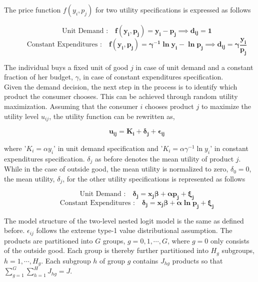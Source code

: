 \documentclass[a4paper,11pt]{article}
\begin{document}
    \newpage
    The price function $f(y_{i},p_{j})$ for two utility specifications is expressed as follows 

    \begin{equation*}
        \qquad \text{Unit Demand :} \quad \mathbf{f(y_{i},p_{j}) = y_{i} - p_{j} \implies d_{ij} = 1}
    \end{equation*}
    \begin{equation*}
        \qquad \text{Constant Expenditures :} \quad \mathbf{f(y_{i},p_{j}) = \gamma^{-1}\ln y_{i} - \ln p_{j} \implies d_{ij} = \gamma\dfrac{y_{i}}{p_{j}}}
    \end{equation*}

    The individual buys a fixed unit of good $j$ in case of unit demand and a constant fraction of her budget, $\gamma$, in case of constant expenditures specification.\\

    Given the demand decision, the next step in the process is to identify which product the consumer chooses. This can be achieved through random utility maximization. Assuming that the consumer $i$ chooses product $j$ to maximize the utility level $u_{ij}$, the utility function can be rewritten as,

    \begin{equation*}
        \qquad \mathbf{u_{ij} = K_{i} + \delta_{j} + \epsilon_{ij}}
    \end{equation*}

    where '$K_{i} = \alpha y_{i}$' in unit demand specification and '$K_{i} = \alpha\gamma^{-1}\ln y_{i}$' in constant expenditures specification. $\delta_{j}$ as before denotes the mean utility of product $j$.\\ 
    
    While in the case of outside good, the mean utility is normalized to zero, $\delta_{0} = 0$, the mean utility, $\delta_{j}$, for the other utility specifications is represented as follows

    \begin{equation*}
        \qquad \text{Unit Demand :} \quad \mathbf{\delta_{j} = x_{j}\beta + \alpha p_{j} + \xi_{j}}
    \end{equation*}
    \begin{equation*}
        \qquad \text{Constant Expenditures :} \quad \mathbf{\delta_{j} = x_{j}\beta + \alpha\ln p_{j} + \xi_{j}}
    \end{equation*}

    The model structure of the two-level nested logit model is the same as defined before. $\epsilon_{ij}$ follows the extreme type-1 value distributional assumption. The products are partitioned into $G$ groups, $g = 0, 1, \cdots, G$, where $g = 0$ only consists of the outside good. Each group is thereby further partitioned into $H_{g}$ subgroups, $h = 1, \cdots, H_{g}$. Each subgroup $h$ of group $g$ contains $J_{hg}$ products so that $\sum_{g = 1}^{G} \sum_{h = 1}^{H} J_{hg} = J$.\\ 
    
\end{document}
